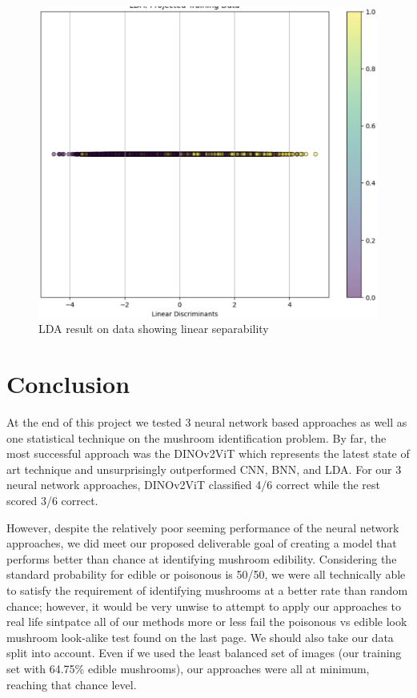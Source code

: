 \documentclass[journal]{IEEEtran}
\begin{document}
\begin{figure}[H]
    \includegraphics[width=\linewidth]{imgs/ldaplot.png}
    \caption{LDA result on data showing linear separability}
\end{figure}
\section{Conclusion}
At the end of this project we tested 3 neural network based approaches as well as one statistical technique on the mushroom identification problem. By far, the most successful approach was the DINOv2ViT which represents the latest state of art technique and unsurprisingly outperformed CNN, BNN, and LDA. For our 3 neural network approaches, DINOv2ViT classified 4/6 correct while the rest scored 3/6 correct.

However, despite the relatively poor seeming performance of the neural network approaches, we did meet our proposed deliverable goal of creating a model that performs better than chance at identifying mushroom edibility. Considering the standard probability for edible or poisonous is 50/50, we were all technically able to satisfy the requirement of identifying mushrooms at a better rate than random chance; however, it would be very unwise to attempt to apply our approaches to real life sintpatce all of our methods more or less fail the poisonous vs edible look mushroom look-alike test found on the last page. We should also take our data split into account. Even if we used the least balanced set of images (our training set with 64.75\% edible mushrooms), our approaches were all at minimum, reaching that chance level. 
\end{document}
